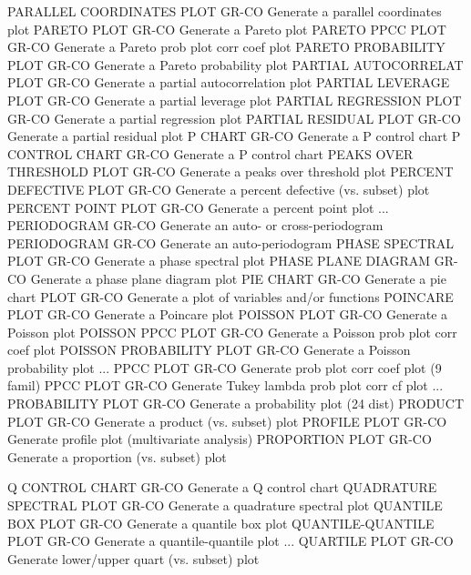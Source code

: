 PARALLEL COORDINATES PLOT   GR-CO Generate a parallel coordinates plot
PARETO PLOT                 GR-CO Generate a Pareto plot
PARETO PPCC PLOT            GR-CO Generate a Pareto prob plot corr coef plot
PARETO PROBABILITY PLOT     GR-CO Generate a Pareto probability plot
PARTIAL AUTOCORRELAT PLOT   GR-CO Generate a partial autocorrelation plot
PARTIAL LEVERAGE PLOT       GR-CO Generate a partial leverage plot
PARTIAL REGRESSION PLOT     GR-CO Generate a partial regression plot
PARTIAL RESIDUAL PLOT       GR-CO Generate a partial residual plot
P CHART                     GR-CO Generate a P control chart
P CONTROL CHART             GR-CO Generate a P control chart
PEAKS OVER THRESHOLD PLOT   GR-CO Generate a peaks over threshold plot
PERCENT DEFECTIVE PLOT      GR-CO Generate a percent defective (vs. subset) plot
PERCENT POINT PLOT          GR-CO Generate a percent point plot
... PERIODOGRAM             GR-CO Generate an auto- or cross-periodogram
PERIODOGRAM                 GR-CO Generate an auto-periodogram
PHASE SPECTRAL PLOT         GR-CO Generate a phase spectral plot
PHASE PLANE DIAGRAM         GR-CO Generate a phase plane diagram plot
PIE CHART                   GR-CO Generate a pie chart
PLOT                        GR-CO Generate a plot of variables and/or functions
POINCARE PLOT               GR-CO Generate a Poincare plot
POISSON PLOT                GR-CO Generate a Poisson plot
POISSON PPCC PLOT           GR-CO Generate a Poisson prob plot corr coef plot
POISSON PROBABILITY PLOT    GR-CO Generate a Poisson probability plot
... PPCC PLOT               GR-CO Generate prob plot corr coef plot (9 famil)
PPCC PLOT                   GR-CO Generate Tukey lambda prob plot corr cf plot
... PROBABILITY PLOT        GR-CO Generate a probability plot (24 dist)
PRODUCT PLOT                GR-CO Generate a product (vs. subset) plot
PROFILE PLOT                GR-CO Generate profile plot (multivariate analysis)
PROPORTION PLOT             GR-CO Generate a proportion (vs. subset) plot

Q CONTROL CHART             GR-CO Generate a Q control chart
QUADRATURE SPECTRAL PLOT    GR-CO Generate a quadrature spectral plot
QUANTILE BOX PLOT           GR-CO Generate a quantile box plot
QUANTILE-QUANTILE PLOT      GR-CO Generate a quantile-quantile plot
... QUARTILE PLOT           GR-CO Generate lower/upper quart (vs. subset) plot

